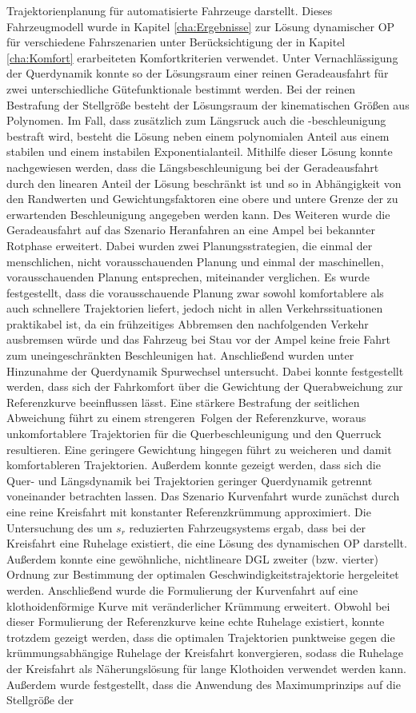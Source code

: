 Trajektorienplanung für automatisierte Fahrzeuge darstellt. Dieses Fahrzeugmodell wurde in Kapitel \ref{cha:Ergebnisse} zur Lösung dynamischer \gls{OP} für verschiedene Fahrszenarien unter Berücksichtigung der in Kapitel \ref{cha:Komfort} erarbeiteten Komfortkriterien verwendet. Unter Vernachlässigung der Querdynamik konnte so der Lösungsraum einer reinen Geradeausfahrt für zwei unterschiedliche Gütefunktionale bestimmt werden. Bei der reinen Bestrafung der Stellgröße besteht der Lösungsraum der kinematischen Größen aus Polynomen. Im Fall, dass zusätzlich zum Längsruck auch die -beschleunigung bestraft wird, besteht die Lösung neben einem polynomialen Anteil aus einem stabilen und einem instabilen Exponentialanteil. Mithilfe dieser Lösung konnte nachgewiesen werden, dass die Längsbeschleunigung bei der Geradeausfahrt durch den linearen Anteil der Lösung beschränkt ist und so in Abhängigkeit von den Randwerten und Gewichtungsfaktoren eine obere und untere Grenze der zu erwartenden Beschleunigung angegeben werden kann. Des Weiteren wurde die Geradeausfahrt auf das Szenario Heranfahren an eine Ampel bei bekannter Rotphase erweitert. Dabei wurden zwei Planungsstrategien, die einmal der menschlichen, nicht vorausschauenden Planung und einmal der maschinellen, vorausschauenden Planung entsprechen, miteinander verglichen. Es wurde festgestellt, dass die vorausschauende Planung zwar sowohl komfortablere als auch schnellere Trajektorien liefert, jedoch nicht in allen Verkehrssituationen praktikabel ist, da ein frühzeitiges Abbremsen den nachfolgenden Verkehr ausbremsen würde und das Fahrzeug bei Stau vor der Ampel keine freie Fahrt zum uneingeschränkten Beschleunigen hat. Anschließend wurden unter Hinzunahme der Querdynamik Spurwechsel untersucht. Dabei konnte festgestellt werden, dass sich der Fahrkomfort über die Gewichtung der Querabweichung zur Referenzkurve beeinflussen lässt. Eine stärkere Bestrafung der seitlichen Abweichung führt zu einem \glqq strengeren\grqq~Folgen der Referenzkurve, woraus unkomfortablere Trajektorien für die Querbeschleunigung und den Querruck resultieren. Eine geringere Gewichtung hingegen führt zu weicheren und damit komfortableren Trajektorien. Außerdem konnte gezeigt werden, dass sich die Quer- und Längsdynamik bei Trajektorien geringer Querdynamik getrennt voneinander betrachten lassen. Das Szenario Kurvenfahrt wurde zunächst durch eine reine Kreisfahrt mit konstanter Referenzkrümmung approximiert. Die Untersuchung des um $s_r$ reduzierten Fahrzeugsystems ergab, dass bei der Kreisfahrt eine Ruhelage existiert, die eine Lösung des dynamischen \gls{OP} darstellt. Außerdem konnte eine gewöhnliche, nichtlineare \gls{DGL} zweiter (bzw. vierter) Ordnung zur Bestimmung der optimalen Geschwindigkeitstrajektorie hergeleitet werden. Anschließend wurde die Formulierung der Kurvenfahrt auf eine klothoidenförmige Kurve mit veränderlicher Krümmung erweitert. Obwohl bei dieser Formulierung der Referenzkurve keine echte Ruhelage existiert, konnte trotzdem gezeigt werden, dass die optimalen Trajektorien punktweise gegen die krümmungsabhängige Ruhelage der Kreisfahrt konvergieren, sodass die Ruhelage der Kreisfahrt als Näherungslösung für lange Klothoiden verwendet werden kann. Außerdem wurde festgestellt, dass die Anwendung des Maximumprinzips auf die Stellgröße der 